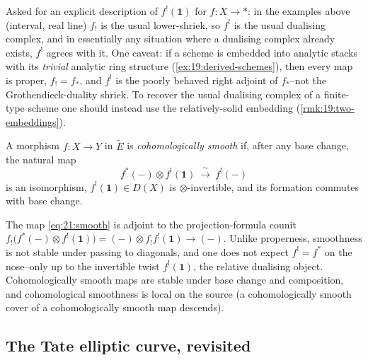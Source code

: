 \begin{remark}
\label{rmk:21:fshriek-unit}
Asked for an explicit description of $f^!(\mathbf 1)$ for $f\colon X\to\ast$: in
the examples above (interval, real line) $f_!$ is the usual lower-shriek, so
$f^!$ is the usual dualising complex, and in essentially any situation where a
dualising complex already exists, $f^!$ agrees with it. One caveat: if a scheme
is embedded into analytic stacks with its \emph{trivial} analytic ring structure
(\cref{ex:19:derived-schemes}), then every map is proper, $f_!=f_*$, and $f^!$ is
the poorly behaved right adjoint of $f_*$--not the Grothendieck-duality shriek.
To recover the usual dualising complex of a finite-type scheme one should instead
use the relatively-solid embedding (\cref{rmk:19:two-embeddings}).
\end{remark}

\begin{definition}
\label{def:21:smooth}
A morphism $f\colon X\to Y$ in $\widetilde E$ is \emph{cohomologically smooth} if,
after any base change, the natural map
\begin{equation}
\label{eq:21:smooth}
f^{*}(-)\otimes f^{!}(\mathbf 1)\ \xrightarrow{\ \sim\ }\ f^{!}(-)
\end{equation}
is an isomorphism, $f^{!}(\mathbf 1)\in D(X)$ is $\otimes$-invertible, and its
formation commutes with base change.
\end{definition}

The map \eqref{eq:21:smooth} is adjoint to the projection-formula counit
$f_!\bigl(f^{*}(-)\otimes f^{!}(\mathbf 1)\bigr)=(-)\otimes f_!f^{!}(\mathbf 1)
\to(-)$. Unlike properness, smoothness is not stable under passing to diagonals,
and one does not expect $f^{!}=f^{*}$ on the nose--only up to the invertible
twist $f^{!}(\mathbf 1)$, the relative dualising object. Cohomologically smooth
maps are stable under base change and composition, and cohomological smoothness
is local on the source (a cohomologically smooth cover of a cohomologically
smooth map descends).

\subsection{The Tate elliptic curve, revisited}
\label{subsec:21:tate}


